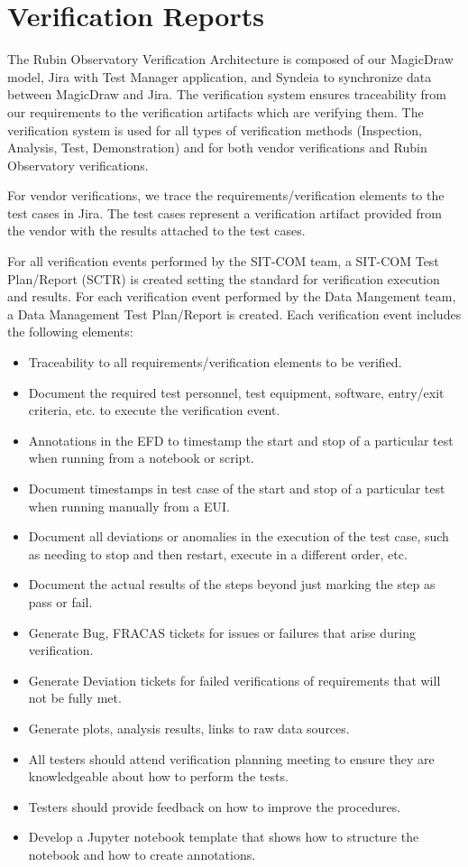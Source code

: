 \newpage
\section{Verification Reports}

The Rubin Observatory Verification Architecture is composed of our MagicDraw model, Jira with Test Manager application, and Syndeia to synchronize data between MagicDraw and Jira. The verification system ensures traceability from our requirements to the verification artifacts which are verifying them. The verification system is used for all types of verification methods (Inspection, Analysis, Test, Demonstration) and for both vendor verifications and Rubin Observatory verifications.

For vendor verifications, we trace the requirements/verification elements to the test cases in Jira. The test cases represent a verification artifact provided from the vendor with the results attached to the test cases.

For all verification events performed by the SIT-COM team, a SIT-COM Test Plan/Report (SCTR) is created setting the standard for verification execution and results. For each verification event performed by the Data Mangement team, a Data Management Test Plan/Report is created. Each verification event includes the following elements:

\begin{itemize}

	\item Traceability to all requirements/verification elements to be verified.
	\item Document the required test personnel, test equipment, software, entry/exit criteria, etc. to execute the verification event.
	\item Annotations in the EFD to timestamp the start and stop of a particular test when running from a notebook or script.
	\item Document timestamps in test case of the start and stop of a particular test when running manually from a EUI.
	\item Document all deviations or anomalies in the execution of the test case, such as needing to stop and then restart, execute in a different order, etc.
	\item Document the actual results of the steps beyond just marking the step as pass or fail.
	\item Generate Bug, FRACAS tickets for issues or failures that arise during verification.
	\item Generate Deviation tickets for failed verifications of requirements that will not be fully met.
	\item Generate plots, analysis results, links to raw data sources.
	\item All testers should attend verification planning meeting to ensure they are knowledgeable about how to perform the tests.
	\item Testers should provide feedback on how to improve the procedures.
	\item Develop a Jupyter notebook template that shows how to structure the notebook and how to create annotations.

\end{itemize}

